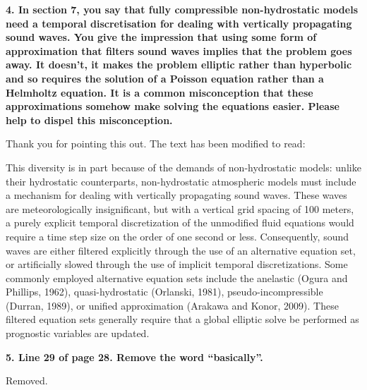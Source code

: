\documentclass{article}
\begin{document}
\textbf{{4. In section 7, you say that fully compressible non-hydrostatic models need a temporal
discretisation for dealing with vertically propagating sound waves. You give the
impression that using some form of approximation that filters sound waves implies that
the problem goes away. It doesn't, it makes the problem elliptic rather than hyperbolic
and so requires the solution of a Poisson equation rather than a Helmholtz equation.
It is a common misconception that these approximations somehow make solving the
equations easier. Please help to dispel this misconception.}}

Thank you for pointing this out.  The text has been modified to read:

{\color{blue}This diversity is in part because of the demands of non-hydrostatic models: unlike their hydrostatic counterparts, non-hydrostatic atmospheric models must include a mechanism for dealing with vertically propagating sound waves.  These waves are meteorologically insignificant, but with a vertical grid spacing of 100 meters, a purely explicit temporal discretization of the unmodified fluid equations would require a time step size on the order of one second or less.  Consequently, sound waves are either filtered explicitly through the use of an alternative equation set, or artificially slowed through the use of implicit temporal discretizations.  Some commonly employed alternative equation sets include the anelastic (Ogura and Phillips, 1962), quasi-hydrostatic (Orlanski, 1981), pseudo-incompressible (Durran, 1989), or unified approximation (Arakawa and Konor, 2009).  These filtered equation sets generally require that a global elliptic solve be performed as prognostic variables are updated.}

\textbf{{5. Line 29 of page 28. Remove the word ``basically''.}}

Removed.
\end{document}
